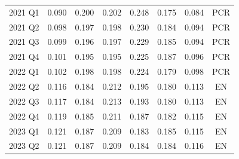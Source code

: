 \documentclass[11pt]{article}
\begin{document}
\begin{table}[htbp]
{\begin{tabular}{l c c c c c c c}
2021 Q1 & 0.090 & 0.200 & 0.202 & 0.248 & 0.175 & 0.084 & PCR \\
2021 Q2 & 0.098 & 0.197 & 0.198 & 0.230 & 0.184 & 0.094 & PCR \\
2021 Q3 & 0.099 & 0.196 & 0.197 & 0.229 & 0.185 & 0.094 & PCR \\
2021 Q4 & 0.101 & 0.195 & 0.195 & 0.225 & 0.187 & 0.096 & PCR \\
2022 Q1 & 0.102 & 0.198 & 0.198 & 0.224 & 0.179 & 0.098 & PCR \\
2022 Q2 & 0.116 & 0.184 & 0.212 & 0.195 & 0.180 & 0.113 & EN \\
2022 Q3 & 0.117 & 0.184 & 0.213 & 0.193 & 0.180 & 0.113 & EN \\
2022 Q4 & 0.119 & 0.185 & 0.211 & 0.187 & 0.182 & 0.115 & EN \\
2023 Q1 & 0.121 & 0.187 & 0.209 & 0.183 & 0.185 & 0.115 & EN \\
2023 Q2 & 0.121 & 0.187 & 0.209 & 0.184 & 0.184 & 0.116 & EN \\
\bottomrule
\end{tabular}
}
\end{table}
\end{document}
